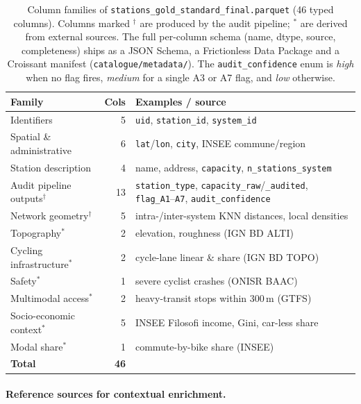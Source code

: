 \documentclass[11pt,a4paper]{article}
\begin{document}
\begin{table}[!htbp]
\centering
\caption{Column families of \texttt{stations\_gold\_standard\_final.parquet}
(46 typed columns). Columns marked $^\dag$ are produced by the audit
pipeline; $^\ast$ are derived from external sources. The full per-column
schema (name, dtype, source, completeness) ships as a JSON Schema, a
Frictionless Data Package and a Croissant manifest
(\texttt{catalogue/metadata/}). The \texttt{audit\_confidence} enum is
\emph{high} when no flag fires, \emph{medium} for a single A3 or A7 flag,
and \emph{low} otherwise.}
\label{tab:schema}
\small
\begin{tabular}{@{}lrl@{}}
\toprule
\textbf{Family} & \textbf{Cols} & \textbf{Examples / source}\\
\midrule
Identifiers                   & 5  & \texttt{uid}, \texttt{station\_id}, \texttt{system\_id}\\
Spatial \& administrative     & 6  & \texttt{lat}/\texttt{lon}, \texttt{city}, INSEE commune/region\\
Station description           & 4  & name, address, \texttt{capacity}, \texttt{n\_stations\_system}\\
Audit pipeline outputs$^\dag$ & 13 & \texttt{station\_type}, \texttt{capacity\_raw}/\texttt{\_audited}, \texttt{flag\_A1}--\texttt{A7}, \texttt{audit\_confidence}\\
Network geometry$^\dag$       & 5  & intra-/inter-system KNN distances, local densities\\
Topography$^\ast$             & 2  & elevation, roughness (IGN BD ALTI)\\
Cycling infrastructure$^\ast$ & 2  & cycle-lane linear \& share (IGN BD TOPO)\\
Safety$^\ast$                 & 1  & severe cyclist crashes (ONISR BAAC)\\
Multimodal access$^\ast$      & 2  & heavy-transit stops within 300\,m (GTFS)\\
Socio-economic context$^\ast$ & 5  & INSEE Filosofi income, Gini, car-less share\\
Modal share$^\ast$            & 1  & commute-by-bike share (INSEE)\\
\midrule
\textbf{Total}                & \textbf{46} & \\
\bottomrule
\end{tabular}
\end{table}

\paragraph{Reference sources for contextual enrichment.}
\end{document}
